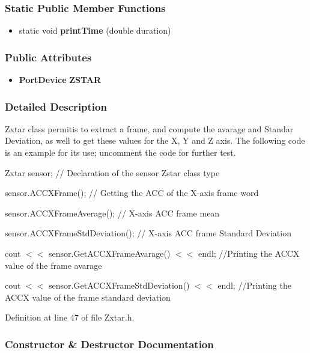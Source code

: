 \begin{appendices}
\subsubsection*{\-Static \-Public \-Member \-Functions}
\begin{itemize}
\item 
static void {\bf print\-Time} (double duration)
\end{itemize}
\subsubsection*{\-Public \-Attributes}
\begin{itemize}
\item 
{\bf \-Port\-Device} {\bf \-Z\-S\-T\-A\-R}
\end{itemize}


\subsubsection{\-Detailed \-Description}
\-Zxtar class permitis to extract a frame, and compute the avarage and \-Standar \-Deviation, as well to get these values for the \-X, \-Y and \-Z axis. \-The following code is an example for its use; uncomment the code for further test.

\-Zxtar sensor; // \-Declaration of the sensor \-Zstar class type

sensor.\-A\-C\-C\-X\-Frame(); // \-Getting the \-A\-C\-C of the \-X-\/axis frame word

sensor.\-A\-C\-C\-X\-Frame\-Average(); // \-X-\/axis \-A\-C\-C frame mean

sensor.\-A\-C\-C\-X\-Frame\-Std\-Deviation(); // \-X-\/axis \-A\-C\-C frame \-Standard \-Deviation

cout $<$$<$ sensor.\-Get\-A\-C\-C\-X\-Frame\-Avarage() $<$$<$ endl; //\-Printing the \-A\-C\-C\-X value of the frame avarage

cout $<$$<$ sensor.\-Get\-A\-C\-C\-X\-Frame\-Std\-Deviation() $<$$<$ endl; //\-Printing the \-A\-C\-C\-X value of the frame standard deviation 

\-Definition at line 47 of file \-Zxtar.\-h.



\subsubsection{\-Constructor \& \-Destructor \-Documentation}

\end{appendices}
